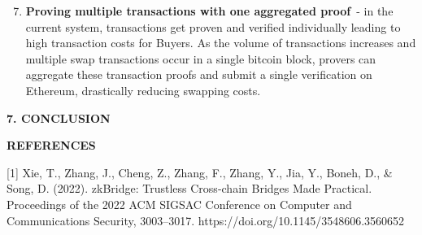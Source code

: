 \documentclass[
]{article}
\providecommand{\tightlist}{%
  \setlength{\itemsep}{0pt}\setlength{\parskip}{0pt}}
\begin{document}
{{{}

\begin{enumerate}
\setcounter{enumi}{6}
\tightlist
\item
  \textbf{Proving multiple transactions with one aggregated proof}{~- in the
  current system, transactions get proven and verified individually
  leading to high transaction costs for Buyers. As the volume of
  transactions increases and multiple swap transactions occur in a
  single bitcoin block, provers can aggregate these transaction proofs
  and submit a single verification on Ethereum, drastically reducing
  swapping costs.}
\end{enumerate}

{}
{}{}\vspace*{\baselineskip}
\begin{center}
\textbf{7. CONCLUSION}
\end{center}

{}{}\vspace*{\baselineskip}


{}

\hspace*{3em}{In summary, we've proposed a protocol that allows for direct, trustless
swaps between Bitcoin and Ethereum without relying on security
compromising intermediaries. We combined a novel Bitcoin ZK light client
implementation with an on chain order book and escrow smart contract to
create a cross-chain decentralized exchange. The protocol ensures the
same level of security as the Bitcoin and Ethereum networks, and is
highly resilient, as it does not rely on staked capital or third parties
to submit proofs. Rift can be deployed to any Ethereum Virtual Machine
(EVM) chain, allowing liquidity to flow seamlessly between Bitcoin and
Ethereum's ecosystem for the first time.}


{}{}\vspace*{\baselineskip}

\newpage

\begin{center}
\textbf{REFERENCES}
\end{center}

{}{}\vspace*{\baselineskip}
{}


\doublespacing
{{{[}1{]} Xie, T., Zhang, J., Cheng, Z., Zhang, F., Zhang, Y., Jia, Y.,
Boneh, D., \& Song, D. (2022). zkBridge: Trustless Cross-chain Bridges Made Practical. }{Proceedings of the 2022 ACM
SIGSAC Conference on Computer and Communications Security}{,
3003--3017.}{ https://doi.org/10.1145/3548606.3560652}}

}}
\end{document}
